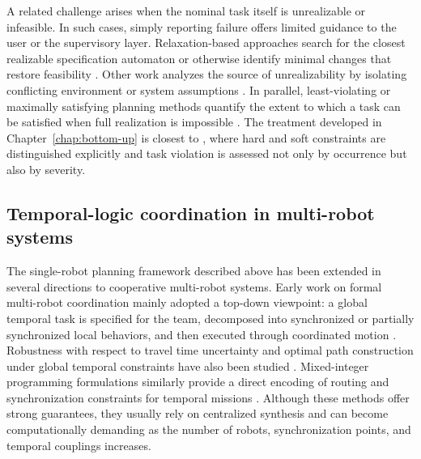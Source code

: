 A related challenge arises when the nominal task itself is unrealizable or
infeasible. In such cases, simply reporting failure offers limited guidance to
the user or the supervisory layer. Relaxation-based approaches search for the
closest realizable specification automaton or otherwise identify minimal changes
that restore feasibility \cite{fainekos2011revising,kim2012approximate}. Other
work analyzes the source of unrealizability by isolating conflicting environment
or system assumptions \cite{raman2011analyzing}. In parallel, least-violating or
maximally satisfying planning methods quantify the extent to which a task can be
satisfied when full realization is impossible
\cite{tumova2013least,tumova2013minimum,lahijanian2015time,
  tumova2014maximally}. The treatment developed in Chapter~\ref{chap:bottom-up}
is closest to \cite{guo2012infeasible,guo2015multi}, where hard and soft
constraints are distinguished explicitly and task violation is assessed not only
by occurrence but also by severity.

\subsection{Temporal-logic coordination in multi-robot systems}

The single-robot planning framework described above has been extended in several
directions to cooperative multi-robot systems. Early work on formal
multi-robot coordination mainly adopted a top-down viewpoint: a global temporal
task is specified for the team, decomposed into synchronized or partially
synchronized local behaviors, and then executed through coordinated motion
\cite{kloetzer2010automatic,ding2011automatic}. Robustness with respect to travel
time uncertainty and optimal path construction under global temporal constraints
have also been studied \cite{ulusoy2012robust,ulusoy2013optimality}. Mixed-integer
programming formulations similarly provide a direct encoding of routing and
synchronization constraints for temporal missions \cite{karaman2011sampling}.
Although these methods offer strong guarantees, they usually rely on centralized
synthesis and can become computationally demanding as the number of robots,
synchronization points, and temporal couplings increases.

